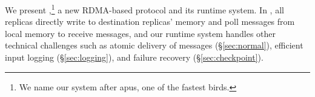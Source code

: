 %
%
%

We present \xxx,\footnote{We name our system after
apus, one of the fastest birds.} a new RDMA-based \paxos protocol and its
runtime system. In \xxx, all replicas directly write to destination
replicas' memory and poll messages from local memory to receive messages, and 
our runtime system handles other technical challenges such as atomic delivery 
of messages (\S\ref{sec:normal}), efficient input logging 
(\S\ref{sec:logging}), and failure recovery (\S\ref{sec:checkpoint}).

